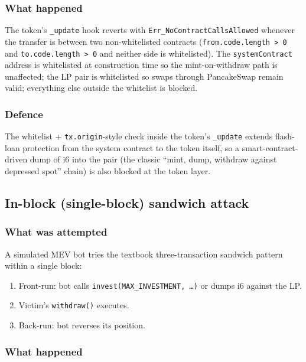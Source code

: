 \documentclass[11pt,a4paper]{article}
\begin{document}
\subsubsection*{What happened}

The token's \texttt{\_update} hook reverts with
\texttt{Err\_NoContractCallsAllowed} whenever the transfer is between two
non-whitelisted contracts (\texttt{from.code.length > 0} and
\texttt{to.code.length > 0} and neither side is whitelisted). The
\texttt{systemContract} address is whitelisted at construction time so the
mint-on-withdraw path is unaffected; the LP pair is whitelisted so swaps
through PancakeSwap remain valid; everything else outside the whitelist is
blocked.

\subsubsection*{Defence}

The whitelist + \texttt{tx.origin}-style check inside the token's
\texttt{\_update} extends flash-loan protection from the system contract to
the token itself, so a smart-contract-driven dump of i6 into the pair (the
classic ``mint, dump, withdraw against depressed spot'' chain) is also
blocked at the token layer.

\subsection{In-block (single-block) sandwich attack}

\subsubsection*{What was attempted}

A simulated MEV bot tries the textbook three-transaction sandwich pattern
within a single block:

\begin{enumerate}[leftmargin=*]
    \item Front-run: bot calls \texttt{invest(MAX\_INVESTMENT, \dots)} or
          dumps i6 against the LP.
    \item Victim's \texttt{withdraw()} executes.
    \item Back-run: bot reverses its position.
\end{enumerate}

\subsubsection*{What happened}
\end{document}
